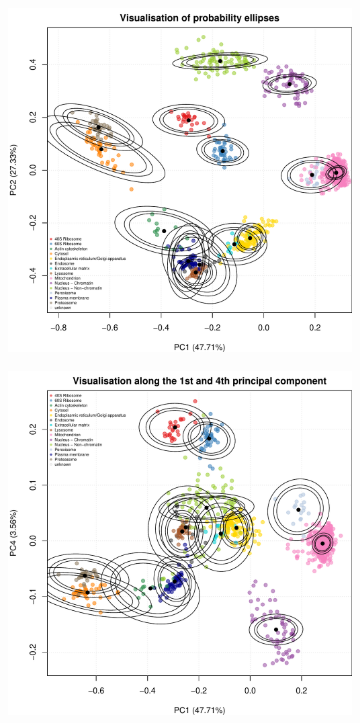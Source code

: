 \documentclass[12pt,english]{article}\usepackage[]{graphicx}\usepackage[]{color}
\makeatletter
\def\maxwidth{ %
  \ifdim\Gin@nat@width>\linewidth
    \linewidth
  \else
    \Gin@nat@width
  \fi
}
\newenvironment{knitrout}{}{} %
\makeatother
\begin{document}
\begin{figure}[ht]
  \begin{subfigure}[t]{0.45\textwidth}
        \centering
\begin{knitrout}
\color{fgcolor}
\includegraphics[width=\maxwidth]{figure/pca12-ellipses-1} 

\end{knitrout}
        \caption{}
\end{subfigure}%
\hfill
\begin{subfigure}[t]{0.45\textwidth}
\begin{knitrout}
\color{fgcolor}
\includegraphics[width=\maxwidth]{figure/pca14-ellipses-1} 


\end{knitrout}
\end{subfigure}
\end{figure}
\end{document}
